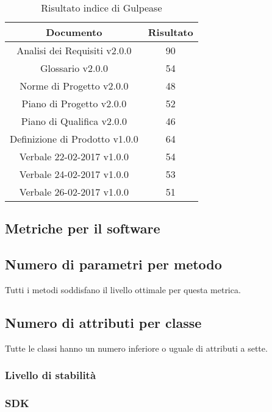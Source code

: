 \begin{table}[h]
	\begin{center}
		\begin{tabular}{|c|c|}
			\hline
			\textbf{Documento}	& \textbf{Risultato} \\
			\hline
			Analisi dei Requisiti v2.0.0 &	90\\
			\hline
			Glossario v2.0.0 &	54\\
			\hline
			Norme di Progetto v2.0.0 &	48\\
			\hline
			Piano di Progetto v2.0.0	&	52\\
			\hline
			Piano di Qualifica v2.0.0	&	46\\
			\hline
			Definizione di Prodotto v1.0.0	&	64\\
			\hline
			Verbale 22-02-2017 v1.0.0	&	54\\
			\hline
			Verbale 24-02-2017 v1.0.0	&	53\\
			\hline
			Verbale 26-02-2017 v1.0.0	&	51\\
			\hline
		\end{tabular}
	\end{center}
	\caption{Risultato indice di Gulpease}
\end{table}

\subsection{Metriche per il software}

\subsection{Numero di parametri per metodo}

Tutti i metodi soddisfano il livello ottimale per questa metrica.

\subsection{Numero di attributi per classe}

Tutte le classi hanno un numero inferiore o uguale di attributi a sette.

\subsubsection{Livello di stabilità}

\subsubsection{SDK}

